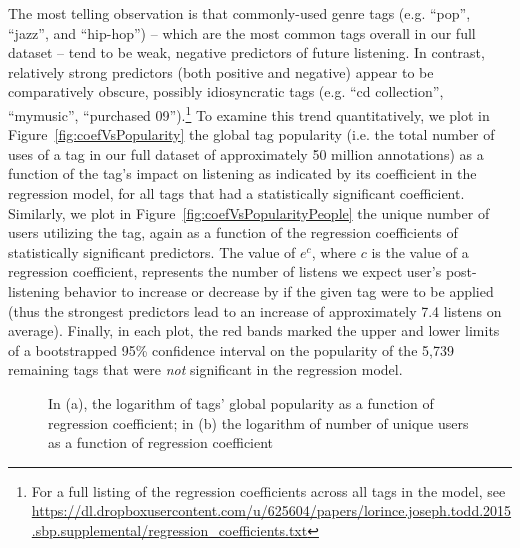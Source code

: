 The most telling observation is that commonly-used genre tags (e.g. ``pop'', ``jazz'', and ``hip-hop'') -- which are the most common tags overall in our full dataset -- tend to be weak, negative predictors of future listening. In contrast, relatively strong predictors (both positive and negative) appear to be comparatively obscure, possibly idiosyncratic tags (e.g. ``cd collection'', ``mymusic'', ``purchased 09'').\footnote{For a full listing of the regression coefficients across all tags in the model, see \url{https://dl.dropboxusercontent.com/u/625604/papers/lorince.joseph.todd.2015.sbp.supplemental/regression_coefficients.txt}} To examine this trend quantitatively, we plot in Figure~\ref{fig:coefVsPopularity} the global tag popularity (i.e. the total number of uses of a tag in our full dataset of approximately 50 million annotations) as a function of the tag's impact on listening as indicated by its coefficient in the regression model, for all tags that had a statistically significant coefficient. Similarly, we plot in Figure~\ref{fig:coefVsPopularityPeople} the unique number of users utilizing the tag, again as a function of the regression coefficients of statistically significant predictors. The value of $e^c$, where $c$ is the value of a regression coefficient, represents the number of listens we expect user's post-listening behavior to increase or decrease by if the given tag were to be applied (thus the strongest predictors lead to an increase of approximately 7.4 listens on average).  Finally, in each plot, the red bands marked the upper and lower limits of a bootstrapped 95\% confidence interval on the popularity of the 5,739 remaining tags that were \emph{not} significant in the regression model. 

  \begin{figure}[t]
    \hfill
    \caption{In (a), the logarithm of tags' global popularity as a function of regression coefficient; in (b) the logarithm of number of unique users as a function of regression coefficient}
    \label{fig:secondPlotSet}
    \vspace{-1em}
  \end{figure}


